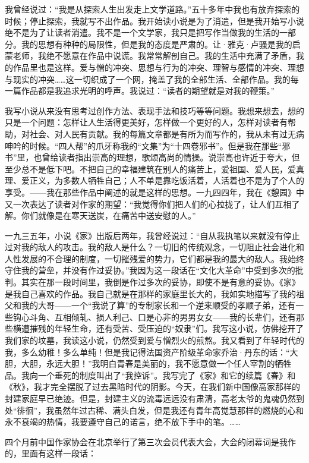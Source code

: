 \par 我曾经说过：“我是从探索人生出发走上文学道路。”五十多年中我也有放弃探索的时候；停止探索，我就写不出作品。我开始读小说是为了消遣，但是我开始写小说绝不是为了让读者消遣。我不是一个文学家，我只是把写作当做我的生活的一部分。我的思想有种种的局限性，但是我的态度是严肃的。让·雅克·卢骚是我的启蒙老师，我绝不愿意在作品中说谎。我常常解剖自己。我的生活中充满了矛盾，我的作品里也是这样。爱与憎的冲突、思想与行为的冲突、理智与感情的冲突、理想与现实的冲突……这一切织成了一个网，掩盖了我的全部生活、全部作品。我的每一篇作品都是我追求光明的呼声。我说过：“读者的期望就是对我的鞭策。”
\par 我写小说从来没有思考过创作方法、表现手法和技巧等等问题。我想来想去，想的只是一个问题：怎样让人生活得更美好，怎样做一个更好的人，怎样对读者有帮助，对社会、对人民有贡献。我的每篇文章都是有所为而写作的，我从未有过无病呻吟的时候。“四人帮”的爪牙称我的“文集”为“十四卷邪书”。但是我在那些“邪书”里，也曾给读者指出崇高的理想，歌颂高尚的情操。说崇高也许近于夸大，但至少总不是低下吧。不把自己的幸福建筑在别人的痛苦上，爱祖国、爱人民，爱真理、爱正义，为多数人牺牲自己；人不单是靠吃饭活着，人活着也不是为了个人的享受。——我在那些作品中阐述的就是这样的思想。一九四四年，我在《憩园》中又一次表达了读者对作家的期望：“我觉得你们把人们的心拉拢了，让人们互相了解。你们就像是在寒天送炭，在痛苦中送安慰的人。”
\par 一九三五年，小说《家》出版后两年，我曾经说过：“自从我执笔以来就没有停止过对我的敌人的攻击。我的敌人是什么？一切旧的传统观念，一切阻止社会进化和人性发展的不合理的制度，一切摧残爱的势力，它们都是我的最大的敌人。我始终守住我的营垒，并没有作过妥协。”我因为这一段话在“文化大革命”中受到多次的批判。其实在那一段时间里，我倒是作过多次的妥协，即使不是有意的妥协。《家》是我自己喜欢的作品。我自己就是在那样的家庭里长大的，我如实地描写了我的祖父和我的大哥——一个“我说了算”的专制家长和一个逆来顺受的孝顺子弟，还有一些钩心斗角、互相倾轧、损人利己、口是心非的男男女女——我的长辈们，还有那些横遭摧残的年轻生命，还有受苦、受压迫的“奴隶”们。我写这小说，仿佛挖开了我们家的坟墓，我读这小说，仍然受到爱与憎烈火的煎熬。我又看到了年轻时代的我，多么幼稚！多么单纯！但是我记得法国资产阶级革命家乔治·丹东的话：“大胆，大胆，永远大胆！”我明白青春是美丽的，我不愿意做一个任人宰割的牺牲品。我向一个垂死的制度叫出了“我控诉”。我写完了《家》和它的续篇《春》和《秋》，我才完全摆脱了过去黑暗时代的阴影。今天，在我们新中国像高家那样的封建家庭早已绝迹。但是，封建主义的流毒远远没有肃清，高老太爷的鬼魂仍然到处“徘徊”，我虽然年过古稀、满头白发，但是我还有青年高觉慧那样的燃烧的心和永不衰竭的热情，我要遵守自己的诺言，绝不放下手中的笔。……
\par 四个月前中国作家协会在北京举行了第三次会员代表大会，大会的闭幕词是我作的，里面有这样一段话：
